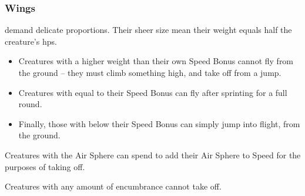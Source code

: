 \begin{multicols}{2}
\subsubsection{Wings}
demand delicate proportions.
Their sheer size mean their \gls{weight} equals half the creature's \glspl{hp}.

\begin{itemize}
  \item
  Creatures with a higher \gls{weight} than their own Speed Bonus cannot fly from the ground -- they must climb something high, and take off from a jump.
  \item
  Creatures with  equal to their Speed Bonus can fly after sprinting for a full round.
  \item
  Finally, those with  below their Speed Bonus can simply jump into flight, from the ground.
\end{itemize}

Creatures with the Air Sphere can spend  to add their Air Sphere to Speed for the purposes of taking off.

Creatures with any amount of encumbrance cannot take off.

\end{multicols}

